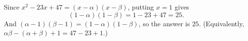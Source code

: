 Since $x^2-23x+47=(x-\alpha)(x-\beta)$, putting $x=1$ gives
\[(1-\alpha)(1-\beta)=1-23+47=25.\]
And $(\alpha-1)(\beta-1)=(1-\alpha)(1-\beta)$, so the answer is $\boxed{25}$. (Equivalently, $\alpha\beta-(\alpha+\beta)+1=47-23+1$.)
